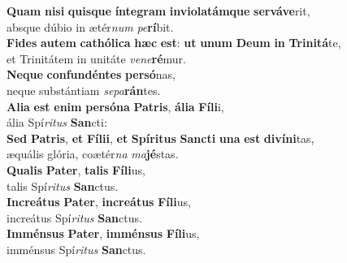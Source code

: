 \evenverse \textbf{Quam} \textbf{ni}\textbf{si} \textbf{quis}\textbf{que} \textbf{ín}\textbf{te}\textbf{gram} \textbf{in}\textbf{vi}\textbf{o}\textbf{la}\textbf{tám}\textbf{que} \textbf{ser}\textbf{vá}\textbf{ve}rit,~\*\\
\evenverse absque dúbio in ætér\textit{num} \textit{pe}\textbf{rí}bit.\\
\oddverse \textbf{Fi}\textbf{des} \textbf{au}\textbf{tem} \textbf{ca}\textbf{thó}\textbf{li}\textbf{ca} \textbf{hæc} \textbf{est}: \textbf{ut} \textbf{u}\textbf{num} \textbf{De}\textbf{um} \textbf{in} \textbf{Tri}\textbf{ni}\textbf{tá}te,~\*\\
\oddverse et Trinitátem in unitáte \textit{ve}\textit{ne}\textbf{ré}mur.\\
\evenverse \textbf{Ne}\textbf{que} \textbf{con}\textbf{fun}\textbf{dén}\textbf{tes} \textbf{per}\textbf{só}nas,~\*\\
\evenverse neque substántiam \textit{se}\textit{pa}\textbf{rán}tes.\\
\oddverse \textbf{A}\textbf{li}\textbf{a} \textbf{est} \textbf{e}\textbf{nim} \textbf{per}\textbf{só}\textbf{na} \textbf{Pa}\textbf{tris}, \textbf{á}\textbf{li}\textbf{a} \textbf{Fí}\textbf{li}i,~\*\\
\oddverse ália Spí\textit{ri}\textit{tus} \textbf{San}cti:\\
\evenverse \textbf{Sed} \textbf{Pa}\textbf{tris}, \textbf{et} \textbf{Fí}\textbf{li}\textbf{i}, \textbf{et} \textbf{Spí}\textbf{ri}\textbf{tus} \textbf{San}\textbf{cti} \textbf{u}\textbf{na} \textbf{est} \textbf{di}\textbf{ví}\textbf{ni}tas,~\*\\
\evenverse æquális glória, coætér\textit{na} \textit{ma}\textbf{jé}stas.\\
\oddverse \textbf{Qua}\textbf{lis} \textbf{Pa}\textbf{ter}, \textbf{ta}\textbf{lis} \textbf{Fí}\textbf{li}us,~\*\\
\oddverse talis Spí\textit{ri}\textit{tus} \textbf{San}ctus.\\
\evenverse \textbf{In}\textbf{cre}\textbf{á}\textbf{tus} \textbf{Pa}\textbf{ter}, \textbf{in}\textbf{cre}\textbf{á}\textbf{tus} \textbf{Fí}\textbf{li}us,~\*\\
\evenverse increátus Spí\textit{ri}\textit{tus} \textbf{San}ctus.\\
\oddverse \textbf{Im}\textbf{mén}\textbf{sus} \textbf{Pa}\textbf{ter}, \textbf{im}\textbf{mén}\textbf{sus} \textbf{Fí}\textbf{li}us,~\*\\
\oddverse imménsus Spí\textit{ri}\textit{tus} \textbf{San}ctus.\\
